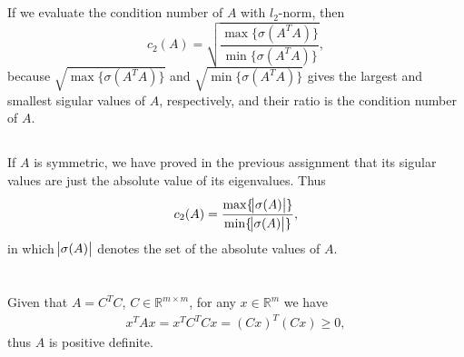\documentclass[11pt]{article}
\begin{document}
\maketitle
\section{}

\section{}

\section{}
\subsection{}
If we evaluate the condition number of $A$ with $l_2$-norm, then 
$$c_2(A) = \sqrt{\frac{\max\{\sigma(A^TA)\}}{\min\{\sigma(A^TA)\}}},$$
because $\sqrt{\max\{\sigma(A^TA) \}}$ and $\sqrt{\min\{\sigma(A^TA) \}}$ gives the largest and smallest sigular values of $A$, respectively, and their ratio is the condition number of $A$.
\subsection{}
If $A$ is symmetric, we have proved in the previous assignment that its sigular values are just the absolute value of its eigenvalues. Thus 
$$c_2(A) = \frac{\max\{\abs{\sigma(A)} \}}{\min\{\abs{\sigma(A)} \}},$$
in which $\abs{\sigma(A)}$ denotes the set of the absolute values of $A$.
\subsection{}

\section{}

\section{}
\subsection{}
Given that $A = C^TC$, $C\in\mathbb{R}^{m\times m}$, for any $x\in\mathbb{R}^m$ we have 
\begin{equation}\begin{split} 
x^TAx = x^TC^TCx = (Cx)^T(Cx)\geq0,
\end{split}\nonumber\end{equation}
thus $A$ is positive definite. 
\end{document}
